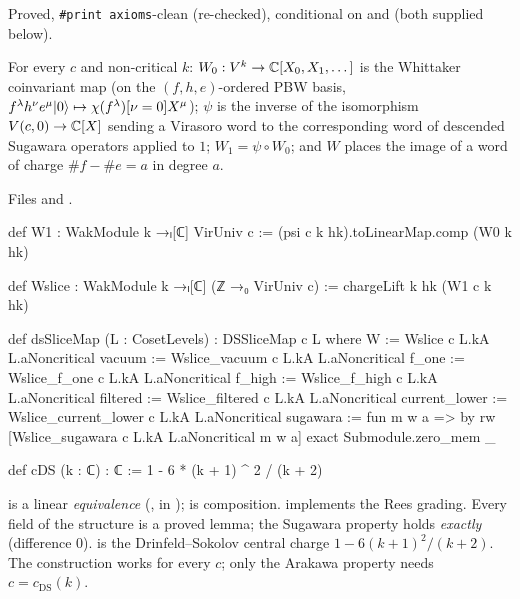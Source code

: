\begin{status}
Proved, \texttt{\#print axioms}-clean (re-checked), conditional on  and  (both supplied below).
\end{status}

\begin{definition}\label{l29:def:dsslicemap}
For every $c$ and non-critical $k$: $W_0:V^k\to{\mathbb{C}}[X_0,X_1,\dots]$ is the Whittaker coinvariant map (on the
$(f,h,e)$-ordered PBW basis, $f^\lambda h^\nu e^\mu|0\rangle\mapsto\chi(f^\lambda)[\nu=0]X^\mu$); $\psi$ is the
inverse of the isomorphism $V(c,0)\to{\mathbb{C}}[X]$ sending a Virasoro word to the corresponding word of descended Sugawara
operators applied to $1$; $W_1=\psi\circ W_0$; and $W$ places the image of a word of charge $\#f-\#e=a$ in degree $a$.
\end{definition}

\noindent Files  and
.
\begin{leancode}
def W1 : WakModule k →ₗ[ℂ] VirUniv c := (psi c k hk).toLinearMap.comp (W0 k hk)

def Wslice : WakModule k →ₗ[ℂ] (ℤ →₀ VirUniv c) := chargeLift k hk (W1 c k hk)

def dsSliceMap (L : CosetLevels) : DSSliceMap c L where
  W := Wslice c L.kA L.aNoncritical
  vacuum := Wslice_vacuum c L.kA L.aNoncritical
  f_one := Wslice_f_one c L.kA L.aNoncritical
  f_high := Wslice_f_high c L.kA L.aNoncritical
  filtered := Wslice_filtered c L.kA L.aNoncritical
  current_lower := Wslice_current_lower c L.kA L.aNoncritical
  sugawara := fun m w a => by
    rw [Wslice_sugawara c L.kA L.aNoncritical m w a]
    exact Submodule.zero_mem _

def cDS (k : ℂ) : ℂ := 1 - 6 * (k + 1) ^ 2 / (k + 2)
\end{leancode}

\begin{dictionary}
 is a linear \emph{equivalence} (,  in
);  is composition.  implements the Rees
grading. Every field of the structure is a proved lemma; the Sugawara property holds \emph{exactly} (difference $0$).
 is the Drinfeld--Sokolov central charge $1-6(k+1)^2/(k+2)$. The construction works for every $c$; only the
Arakawa property needs $c=c_{\mathrm{DS}}(k)$.
\end{dictionary}

